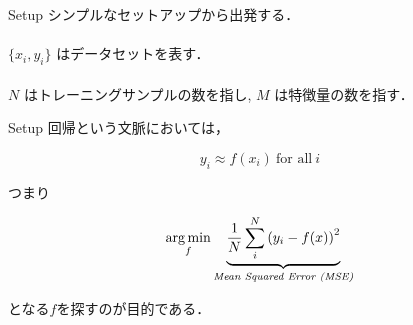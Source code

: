 
\begin{frame}{Setup}
シンプルなセットアップから出発する．\\~\\

$\{ x_i, y_i \}$ はデータセットを表す．\\~\\

$N$ はトレーニングサンプルの数を指し,  $M$ は特徴量の数を指す．
\end{frame}
%

\begin{frame}{Setup}
回帰という文脈においては，

$$ y_i \approx f(x_i) \ \text{for all} \ i $$

つまり

$$\operatorname*{arg\,min}_{f} \underbrace{\frac{1}{N}\sum_i  ^ N\left( y_i - f(x) \right)^2}_{\textit{Mean Squared Error (MSE)}}$$

となる$f$を探すのが目的である．

\end{frame}
%

